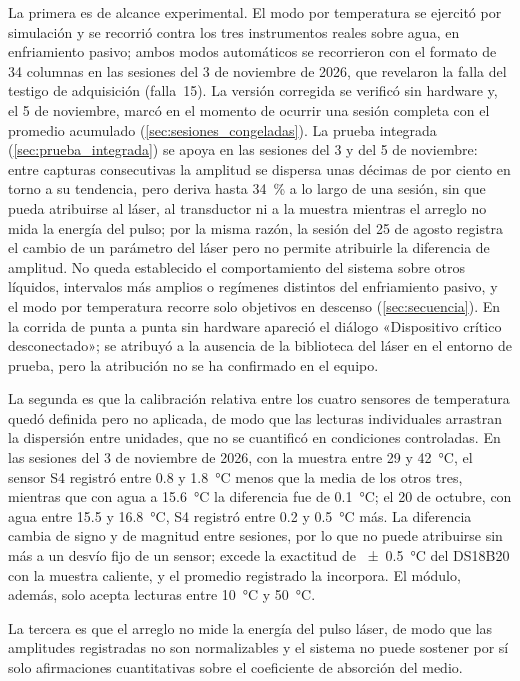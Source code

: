 La primera es de alcance experimental. El modo por temperatura se
ejercitó por simulación y se recorrió contra los tres instrumentos
reales sobre agua, en enfriamiento pasivo; ambos modos automáticos se
recorrieron con el formato de 34 columnas en las sesiones del 3 de
noviembre de 2026, que revelaron la falla del testigo de adquisición
(falla~15). La versión corregida se verificó sin hardware y, el 5 de
noviembre, marcó en el momento de ocurrir una sesión completa con el
promedio acumulado (\cref{sec:sesiones_congeladas}). La prueba
integrada (\cref{sec:prueba_integrada}) se apoya en las sesiones del 3 y
del 5 de noviembre: entre capturas consecutivas la amplitud se dispersa
unas décimas de por ciento en torno a su tendencia, pero deriva hasta
\SI{34}{\percent} a lo largo de una sesión, sin que pueda atribuirse al
láser, al transductor ni a la muestra mientras el arreglo no mida la
energía del pulso; por la misma razón, la sesión del 25 de agosto
registra el cambio de un parámetro del láser pero no permite atribuirle
la diferencia de amplitud. No queda
establecido el
comportamiento del sistema sobre otros líquidos, intervalos más amplios
o regímenes distintos del enfriamiento pasivo, y el modo por temperatura
recorre solo objetivos en descenso (\cref{sec:secuencia}). En la
corrida de punta a punta sin hardware apareció el diálogo «Dispositivo
crítico desconectado»; se atribuyó a la ausencia de la biblioteca del
láser en el entorno de prueba, pero la atribución no se ha confirmado en
el equipo.

La segunda es que la calibración relativa entre los cuatro sensores de
temperatura quedó definida pero no aplicada, de modo que las lecturas
individuales arrastran la dispersión entre unidades, que no se
cuantificó en condiciones controladas. En las sesiones del 3 de noviembre de 2026, con la muestra
entre 29 y \SI{42}{\celsius}, el sensor S4 registró entre 0.8 y
\SI{1.8}{\celsius} menos que la media de los otros tres, mientras que
con agua a \SI{15.6}{\celsius} la diferencia fue de
\SI{+0.1}{\celsius}; el 20 de octubre, con agua entre 15.5 y
\SI{16.8}{\celsius}, S4 registró entre 0.2 y \SI{0.5}{\celsius} más. La
diferencia cambia de signo y de magnitud entre sesiones, por lo que no
puede atribuirse sin más a un desvío fijo de un sensor; excede la
exactitud de \SI{\pm0.5}{\celsius} del DS18B20 con la muestra caliente, y
el promedio registrado la incorpora. El módulo, además, solo acepta
lecturas entre \SI{10}{\celsius} y \SI{50}{\celsius}.

La tercera es que el arreglo no mide la energía del pulso láser, de modo
que las amplitudes registradas no son normalizables y el sistema no
puede sostener por sí solo afirmaciones cuantitativas sobre el
coeficiente de absorción del medio.

